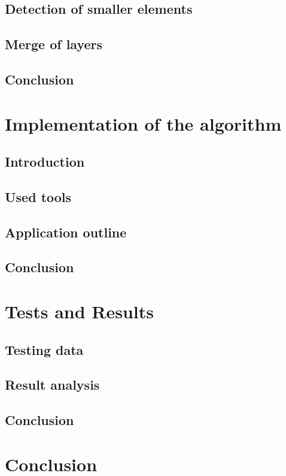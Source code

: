 \documentclass[a4paper,onecolumn,oneside,12pt]{memoir}
\begin{document}
\section{Detection of smaller elements}

\section{Merge of layers}

\section{Conclusion}


\chapter{Implementation of the algorithm}

\section{Introduction}

\section{Used tools}

\section{Application outline}

\section{Conclusion}


\chapter{Tests and Results}

\section{Testing data}

\section{Result analysis}

\section{Conclusion}


\chapter{Conclusion}

\newpage

\begin{thebibliography}{   }


\end{thebibliography}
\end{document}
